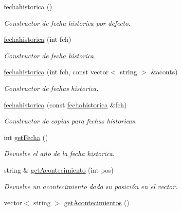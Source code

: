 \begin{DoxyCompactItemize}
\item 
\hyperlink{classfechahistorica_a1d7f729fa18f2d4dc0277099d0918d3a}{fechahistorica} ()\hypertarget{classfechahistorica_a1d7f729fa18f2d4dc0277099d0918d3a}{}\label{classfechahistorica_a1d7f729fa18f2d4dc0277099d0918d3a}

\begin{DoxyCompactList}\small\item\em Constructor de fecha historica por defecto. \end{DoxyCompactList}\item 
\hyperlink{classfechahistorica_a612467ba1f7ec16a31a5c430bd05e810}{fechahistorica} (int fch)
\begin{DoxyCompactList}\small\item\em Constructor de fecha historica. \end{DoxyCompactList}\item 
\hyperlink{classfechahistorica_a770323b5d685d8a57d912d43e2737b09}{fechahistorica} (int fch, const vector$<$ string $>$ \&aconts)
\begin{DoxyCompactList}\small\item\em Constructor de fechas historica. \end{DoxyCompactList}\item 
\hyperlink{classfechahistorica_a2d4edf201db7f2b1038f2c9e6b5f5475}{fechahistorica} (const \hyperlink{classfechahistorica}{fechahistorica} \&fch)
\begin{DoxyCompactList}\small\item\em Constructor de copias para fechas historicas. \end{DoxyCompactList}\item 
int \hyperlink{classfechahistorica_aa3fb43d03ea6062852e99ee3417ba53e}{get\+Fecha} ()
\begin{DoxyCompactList}\small\item\em Devuelve el año de la fecha historica. \end{DoxyCompactList}\item 
string \& \hyperlink{classfechahistorica_ac22e197628f15fdcd335bffba91f5b8f}{get\+Acontecimiento} (int pos)
\begin{DoxyCompactList}\small\item\em Devuelve un acontecimiento dada su posición en el vector. \end{DoxyCompactList}\item 
vector$<$ string $>$ \hyperlink{classfechahistorica_a8d5702108832f6a6d2c3ba2c31a0e1f6}{get\+Acontecimientos} ()

\end{DoxyCompactItemize}
